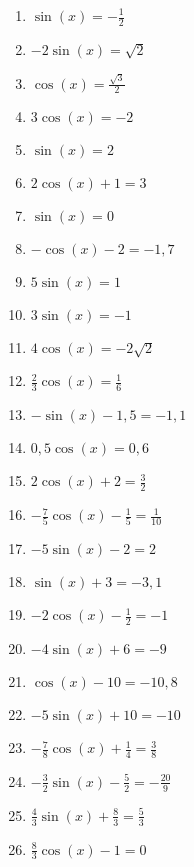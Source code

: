 \newpage
\begin{Exercise}[title={\raggedright\normalfont Bestimme jeweils alle Lösungen:}, label=sincosGleichungenA1]
	\begin{enumerate}[label=\alph*)]
		\item \(\sin(x)=-\frac{1}{2}\)
		\item \(-2\sin(x)=\sqrt{2}\)
		\item \(\cos(x)=\frac{\sqrt{3}}{2}\)
		\item \(3\cos(x)=-2\)
		\item \(\sin(x)=2\)
		\item \(2\cos(x)+1=3\)
		\item \(\sin(x)=0\)
		\item \(-\cos(x)-2=-1,7\)
		\item \(5\sin(x)=1\)
		\item \(3\sin(x)=-1\)
		\item \(4\cos(x)=-2\sqrt{2}\)
		\item \(\frac{2}{3}\cos(x)=\frac{1}{6}\)
		\item \(-\sin(x)-1,5=-1,1\)
		\item \(0,5\cos(x)=0,6\)
		\item \(2\cos(x)+2=\frac{3}{2}\)
		\item \(-\frac{7}{5}\cos(x)-\frac{1}{5}=\frac{1}{10}\)
		\item \(-5\sin(x)-2=2\)
		\item \(\sin(x)+3=-3,1\)
		\item \(-2\cos(x)-\frac{1}{2}=-1\)
		\item \(-4\sin(x)+6=-9\)
		\item \(\cos(x)-10=-10,8\)
		\item \(-5\sin(x)+10=-10\)
		\item \(-\frac{7}{8}\cos(x)+\frac{1}{4}=\frac{3}{8}\)
		\item \(-\frac{3}{2}\sin(x)-\frac{5}{2}=-\frac{20}{9}\)
		\item \(\frac{4}{3}\sin(x)+\frac{8}{3}=\frac{5}{3}\)
		\item \(\frac{8}{3}\cos(x)-1=0\)
	\end{enumerate}
\end{Exercise}

